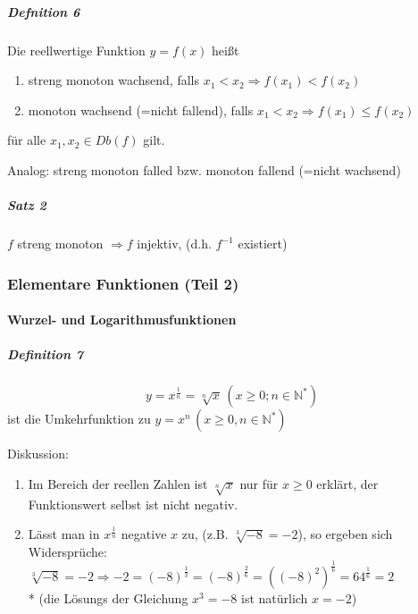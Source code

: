 \documentclass[a4paper]{scrartcl}
\begin{document}
\subparagraph{Defnition 6} Die reellwertige Funktion $y=f(x)$ heißt
\begin{enumerate}
\item streng monoton wachsend, falls $x_1 < x_2 \Rightarrow f(x_1) < f(x_2)$
\item monoton wachsend (=nicht fallend), falls $x_1 < x_2 \Rightarrow f(x_1) \leq f(x_2)$
\end{enumerate}
für alle $x_1, x_2 \in Db(f)$ gilt.

Analog: streng monoton falled bzw. monoton fallend (=nicht wachsend)

\subparagraph{Satz 2} $f$ streng monoton $\Rightarrow f$ injektiv, (d.h. $f^{-1}$ existiert)

\subsubsection{Elementare Funktionen (Teil 2)}
\paragraph{Wurzel- und Logarithmusfunktionen}
\subparagraph{Definition 7}
\[ y = x^{\frac{1}{n}} = \sqrt[n]{x} \, (x\geq 0; n \in \mathbb{N}^*)\]
ist die Umkehrfunktion zu $y=x^n \, (x\geq 0, n \in \mathbb{N}^*)$\\

Diskussion:
\begin{enumerate}
\item Im Bereich der reellen Zahlen ist $\sqrt[n]{x}$ nur für $x \geq 0$ erklärt, der Funktionswert selbst ist nicht negativ.
\item Lässt man in $x^{\frac{1}{n}}$ negative $x$ zu, (z.B. $ \sqrt[3]{-8} = -2$), so ergeben sich Widersprüche: $\sqrt[3]{-8}=-2 \Rightarrow -2 = (-8)^{\frac{1}{3}} = (-8)^{\frac{2}{6}}=((-8)^2)^{\frac{1}{6}} = 64^{\frac{1}{6}} = 2$\\* (die Lösungs der Gleichung $x^3 = -8$ ist natürlich $x=-2$)
\end{enumerate}
\end{document}
